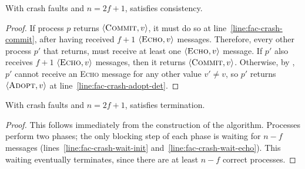 \begin{lemma}
    With crash faults and $n=2f+1$,  satisfies consistency.
\end{lemma}
\begin{proof}
    If process $p$ returns $\langle\textsc{Commit}, v\rangle$, it must do so at line~\ref{line:fac-crash-commit}, after having received $f+1$ $\langle\textsc{Echo}, v\rangle$ messages. Therefore, every other process $p'$ that returns, must receive at least one $\langle\textsc{Echo}, v\rangle$ message. If $p'$ also receives $f+1$ $\langle\textsc{Echo}, v\rangle$ messages, then it returns $\langle\textsc{Commit}, v\rangle$. Otherwise, by , $p'$ cannot receive an \textsc{Echo} message for any other value $v'\ne v$, so $p'$ returns $\langle\textsc{Adopt}, v\rangle$ at line~\ref{line:fac-crash-adopt-det}.
\end{proof}

\begin{lemma}
    With crash faults and $n=2f+1$,  satisfies termination.
\end{lemma}
\begin{proof}
    This follows immediately from the construction of the algorithm. Processes perform two phases; the only blocking step of each phase is waiting for $n-f$ messages (lines~\ref{line:fac-crash-wait-init} and~\ref{line:fac-crash-wait-echo}). This waiting eventually terminates, since there are at least $n-f$ correct processes.
\end{proof}


